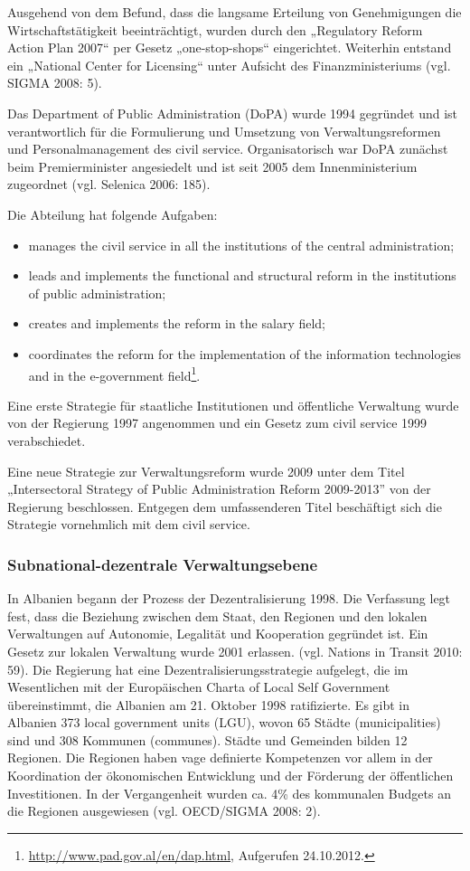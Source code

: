Ausgehend von dem Befund, dass die langsame Erteilung von Genehmigungen die Wirtschaftstätigkeit beeinträchtigt, wurden durch den „Regulatory Reform Action Plan 2007“ per Gesetz „one-stop-shops“ eingerichtet. Weiterhin entstand ein „National Center for Licensing“ unter Aufsicht des Finanzministeriums (vgl. SIGMA 2008: 5).\par
Das Department of Public Administration (DoPA) wurde 1994 gegründet und ist verantwortlich für die Formulierung und Umsetzung von Verwaltungsreformen und Personalmanagement des civil service. Organisatorisch war DoPA zunächst beim Premierminister angesiedelt und ist seit 2005 dem Innenministerium zugeordnet (vgl. Selenica 2006: 185).\par
Die Abteilung hat folgende Aufgaben:
\begin{itemize}
\item manages the civil service in all the institutions of the central administration;
\item leads and implements the functional and structural reform in the institutions of public administration;
\item creates and implements the reform in the salary field;
\item coordinates the reform for the implementation of the information technologies and in the e-government field\footnote{\url{http://www.pad.gov.al/en/dap.html}, Aufgerufen 24.10.2012.}.
\end{itemize}
Eine erste Strategie für staatliche Institutionen und öffentliche Verwaltung wurde von der Regierung 1997 angenommen und ein Gesetz zum civil service 1999 verabschiedet.\par
Eine neue Strategie zur Verwaltungsreform wurde 2009 unter dem Titel „Intersectoral Strategy of Public Administration Reform 2009-2013” von der Regierung beschlossen. Entgegen dem umfassenderen Titel beschäftigt sich die Strategie vornehmlich mit dem civil service. 

\subsubsection{Subnational-dezentrale Verwaltungsebene }
In Albanien begann der Prozess der Dezentralisierung 1998. Die Verfassung legt fest, dass die Beziehung zwischen dem Staat, den Regionen und den lokalen Verwaltungen auf Autonomie, Legalität und Kooperation gegründet ist. Ein Gesetz zur lokalen Verwaltung wurde 2001 erlassen. (vgl. Nations in Transit 2010: 59). Die Regierung hat eine Dezentralisierungsstrategie aufgelegt, die im Wesentlichen mit der Europäischen Charta of Local Self Government übereinstimmt, die Albanien am 21. Oktober 1998 ratifizierte. Es gibt in Albanien 373 local government units (LGU), wovon 65 Städte (municipalities) sind und 308 Kommunen (communes). Städte und Gemeinden bilden 12 Regionen. Die Regionen haben vage definierte Kompetenzen vor allem in der Koordination der ökonomischen Entwicklung und der Förderung der öffentlichen Investitionen. In der Vergangenheit wurden ca. 4\% des kommunalen Budgets an die Regionen ausgewiesen (vgl. OECD/SIGMA 2008: 2). \par

